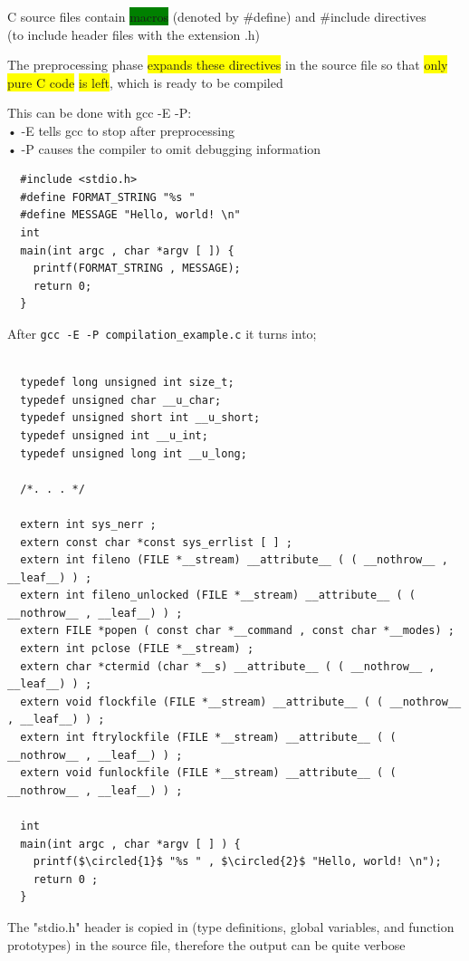 \documentclass[]{project_plan}
\newcommand*\circled[1]{\tikz[baseline=(char.base)]{
            \node[shape=circle,draw,inner sep=2pt] (char) {#1};}}
\begin{document}
C source files contain \colorbox{green}{macros} (denoted by \#define) and \#include directives \\
(to include header files with the extension .h)

The preprocessing phase \colorbox{yellow}{expands these directives} in the source file so that \colorbox{yellow}{only pure C code} \colorbox{yellow}{is
  left}, which is ready to be compiled

This can be done with gcc -E -P:\\
• -E tells gcc to stop after preprocessing\\
• -P causes the compiler to omit debugging information

\begin{lstlisting}
  #include <stdio.h>
  #define FORMAT_STRING "%s "
  #define MESSAGE "Hello, world! \n"
  int
  main(int argc , char *argv [ ]) {
    printf(FORMAT_STRING , MESSAGE);
    return 0;
  }
\end{lstlisting}
After \lstinline|gcc -E -P compilation_example.c| it turns into;\\
\begin{lstlisting}[mathescape]

  typedef long unsigned int size_t;
  typedef unsigned char __u_char;
  typedef unsigned short int __u_short;
  typedef unsigned int __u_int;
  typedef unsigned long int __u_long;

  /*. . . */

  extern int sys_nerr ;
  extern const char *const sys_errlist [ ] ;
  extern int fileno (FILE *__stream) __attribute__ ( ( __nothrow__ , __leaf__) ) ;
  extern int fileno_unlocked (FILE *__stream) __attribute__ ( ( __nothrow__ , __leaf__) ) ;
  extern FILE *popen ( const char *__command , const char *__modes) ;
  extern int pclose (FILE *__stream) ;
  extern char *ctermid (char *__s) __attribute__ ( ( __nothrow__ , __leaf__) ) ;
  extern void flockfile (FILE *__stream) __attribute__ ( ( __nothrow__ , __leaf__) ) ;
  extern int ftrylockfile (FILE *__stream) __attribute__ ( ( __nothrow__ , __leaf__) ) ;
  extern void funlockfile (FILE *__stream) __attribute__ ( ( __nothrow__ , __leaf__) ) ;

  int
  main(int argc , char *argv [ ] ) {
    printf($\circled{1}$ "%s " , $\circled{2}$ "Hello, world! \n");
    return 0 ;
  }
\end{lstlisting}

The "stdio.h" header is copied in (type definitions, global variables,
and function prototypes) in the source file, therefore the output can be
quite verbose
\end{document}
